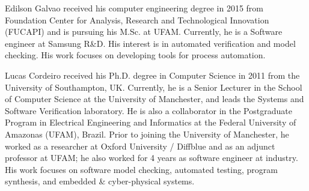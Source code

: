 \documentclass[10pt,journal,compsoc]{IEEEtran}
\begin{document}
\begin{IEEEbiography}
    {Edilson Galvao} received his computer engineering degree in 2015 from Foundation Center for Analysis, Research and Technological Innovation (FUCAPI) and is pursuing his M.Sc. at UFAM. Currently, he is a Software engineer at Samsung R\&D. His interest is in automated verification and model checking. His work focuses on developing tools for process automation.
\end{IEEEbiography}

\begin{IEEEbiography}
    {Lucas Cordeiro}
received his Ph.D. degree in Computer Science in 2011 from the University of Southampton, UK. Currently, he is a Senior Lecturer in the School of Computer Science at the University of Manchester, and leads the Systems and Software Verification laboratory. He is also a collaborator in the Postgraduate Program in Electrical Engineering and Informatics at the Federal University of Amazonas (UFAM), Brazil. Prior to joining the University of Manchester, he worked as a researcher at Oxford University / Diffblue and as an adjunct professor at UFAM; he also worked for 4 years as software engineer at industry. His work focuses on software model checking, automated testing, program synthesis, and embedded \& cyber-physical systems.
\end{IEEEbiography}
\end{document}
